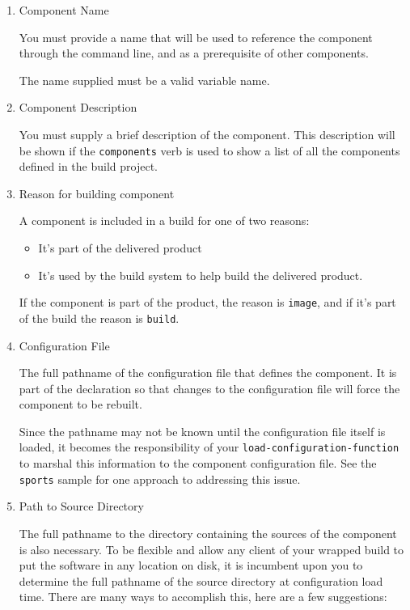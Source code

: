 \begin{enumerate}
\item Component Name

  You must provide a name that will be used to reference the component
  through the \lmsbw command line, and as a prerequisite of other
  components.

  The name supplied must be a valid \makefile variable name.

\item Component Description

  You must supply a brief description of the component.  This
  description will be shown if the \texttt{components} verb is used to
  show a list of all the components defined in the build project.

\item Reason for building component

  A component is included in a build for one of two reasons:

  \begin{itemize}
    \item It's part of the delivered product
    \item It's used by the build system to help build the delivered
      product.
  \end{itemize}

  If the component is part of the product, the reason is
  \texttt{image}, and if it's part of the build the reason is
  \texttt{build}.

\item Configuration File

  The full pathname of the configuration file that defines the
  component.  It is part of the declaration so that changes to the
  configuration file will force the component to be rebuilt.

  Since the pathname may not be known until the configuration file
  itself is loaded, it becomes the responsibility of your
  \texttt{load-configuration-function} to marshal this information to
  the component configuration file.  See the \texttt{sports} sample
  for one approach to addressing this issue.

\item Path to Source Directory

  The full pathname to the directory containing the sources of the
  component is also necessary.  To be flexible and allow any client of
  your wrapped build to put the software in any location on disk, it
  is incumbent upon you to determine the full pathname of the source
  directory at configuration load time.  There are many ways to
  accomplish this, here are a few suggestions:


\end{enumerate}
